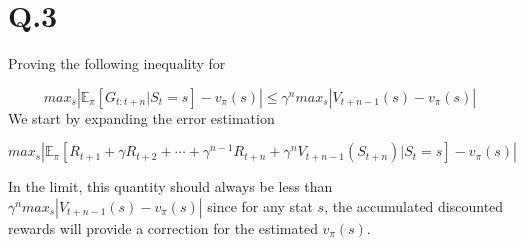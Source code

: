 \documentclass[12pt] {article}
\begin{document}
\section*{Q.3}
Proving the following inequality for 

\[
max_{s}|\mathbb{E}_{\pi} \left[ G_{t:t+n}|S_{t}=s \right] - v_{\pi}(s)| \leq \gamma^{n}max_{s}|V_{t+n-1}(s)-v_{\pi}(s)|
\]
We start by expanding the error estimation 

\[
max_{s}|\mathbb{E}_{\pi} \left[ R_{t+1} + \gamma R_{t+2}+ \cdots + \gamma^{n-1} R_{t+n} + \gamma^{n}V_{t+n-1}(S_{t+n})| S_{t}= s \right]  - v_{\pi}(s)|
\]

In the limit, this quantity should always be less than $\gamma^{n}max_{s}|V_{t+n-1}(s)-v_{\pi}(s)|$ since for any stat $s$, the accumulated discounted rewards will provide a correction for the estimated $v_{\pi}(s)$.
\end{document}
